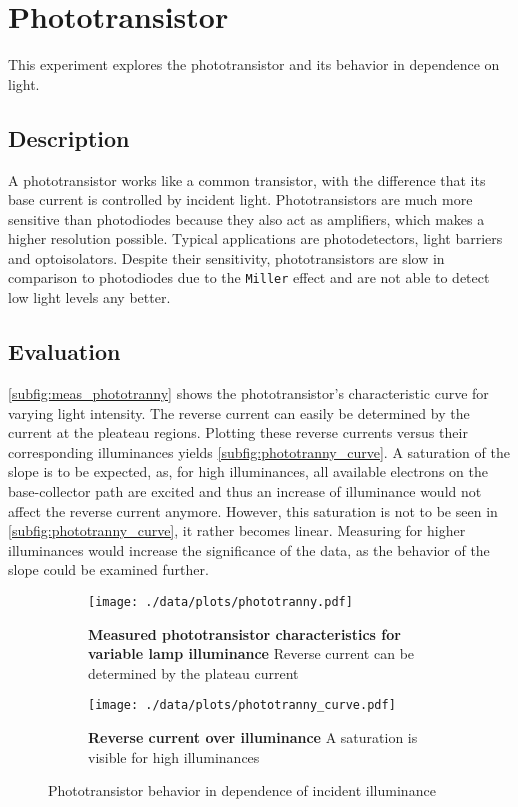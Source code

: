 \chapter{Phototransistor}
This experiment explores the phototransistor and its behavior in dependence on light.

\section{Description}
A phototransistor works like a common transistor, with the difference that its base current is controlled by incident light.
Phototransistors are much more sensitive than photodiodes because they also act as amplifiers, which makes a higher resolution possible.
Typical applications are photodetectors, light barriers and optoisolators.
Despite their sensitivity, phototransistors are slow in comparison to photodiodes due to the \texttt{Miller} effect and are not able to detect low light levels any better.

\section{Evaluation}
\autoref{subfig:meas_phototranny} shows the phototransistor's characteristic curve for varying light intensity.
The reverse current can easily be determined by the current at the pleateau regions.
Plotting these reverse currents versus their corresponding illuminances yields \autoref{subfig:phototranny_curve}.
A saturation of the slope is to be expected, as, for high illuminances, all available electrons on the base-collector path are excited and thus an increase of illuminance would not affect the reverse current anymore.
However, this saturation is not to be seen in \autoref{subfig:phototranny_curve}, it rather becomes linear.
Measuring for higher illuminances would increase the significance of the data, as the behavior of the slope could be examined further.

\begin{figure}[btp]
	\centering
	\begin{subfigure}{0.4\textwidth}
		\centering
		\texttt{[image: ./data/plots/phototranny.pdf]}
		\caption[Measured phototransistor characteristics for variable lamp illuminance]{\textbf{Measured phototransistor characteristics for variable lamp illuminance} Reverse current can be determined by the plateau current}
		\label{subfig:meas_phototranny}
	\end{subfigure}\quad
	\begin{subfigure}{0.4\textwidth}
		\centering
		\texttt{[image: ./data/plots/phototranny\_curve.pdf]}
		\caption[Reverse current over illuminance]{\textbf{Reverse current over illuminance} A saturation is visible for high illuminances}
		\label{subfig:phototranny_curve}
	\end{subfigure}
	\caption{Phototransistor behavior in dependence of incident illuminance}
\end{figure}
